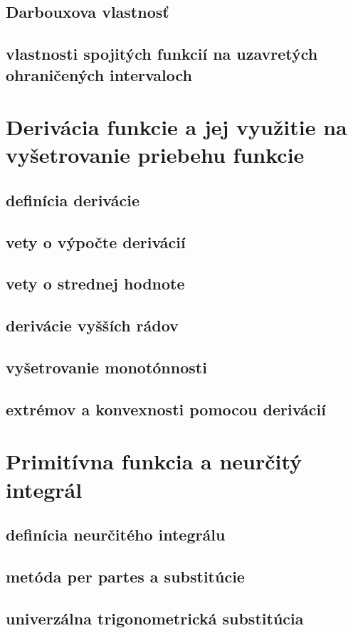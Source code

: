 \subsection{Darbouxova vlastnosť}
\subsection{vlastnosti spojitých funkcií na uzavretých ohraničených intervaloch}

\section{Derivácia funkcie a jej využitie na vyšetrovanie priebehu funkcie}
\subsection{definícia derivácie}
\subsection{vety o výpočte derivácií}
\subsection{vety o strednej hodnote}
\subsection{derivácie vyšších rádov}
\subsection{vyšetrovanie monotónnosti}
\subsection{extrémov a konvexnosti pomocou derivácií}


\section{Primitívna funkcia a neurčitý integrál}
\subsection{definícia neurčitého integrálu}
\subsection{metóda per partes a substitúcie}
\subsection{univerzálna trigonometrická substitúcia}


